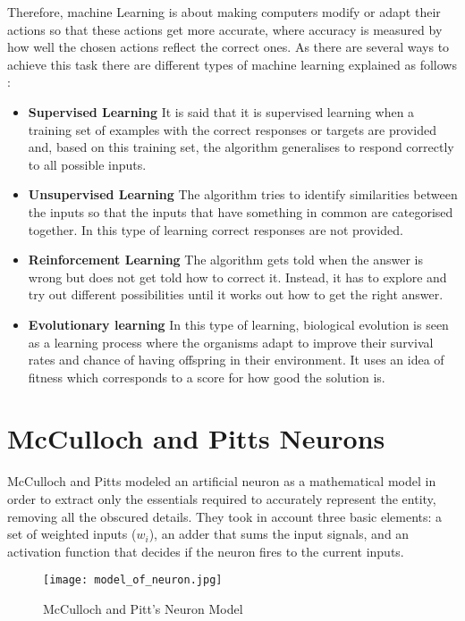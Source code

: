 Therefore, machine Learning is about making computers modify or adapt their actions so that these actions get more accurate, where accuracy is measured by how well the chosen actions reflect the correct ones. As there are several ways to achieve this task there are different types of machine learning explained as follows \cite{marsland2015machine}:

\begin{itemize}
\item \textbf{Supervised Learning} It is said that it is supervised learning when a training set of examples with the correct responses or targets are provided and, based on this training set, the algorithm generalises to respond correctly to all possible inputs.

\item \textbf{Unsupervised Learning} The algorithm tries to identify similarities between the inputs so that the inputs that have something in common are categorised together. In this type of learning correct responses are not provided.

\item \textbf{Reinforcement Learning} The algorithm gets told when the answer is wrong but does not get told how to correct it. Instead, it has to explore and try out different possibilities until it works out how to get the right answer. 

\item \textbf{Evolutionary learning} In this type of learning, biological evolution is seen as a learning process where the organisms adapt to improve their survival rates and chance of having offspring in their environment. It uses an idea of fitness which corresponds to a score for how good the solution is. 
\end{itemize}

\section{McCulloch and Pitts Neurons}
McCulloch and Pitts modeled an artificial neuron as a mathematical model in order to extract only the essentials required to accurately represent the entity, removing all the obscured details. They took in account three basic elements: a set of weighted inputs ($w_i$), an adder that sums the input signals, and an activation function that decides if the neuron fires to the current inputs.
\begin{figure}[h]
\centering
 
\texttt{[image: model\_of\_neuron.jpg]}
\caption{McCulloch and Pitt's Neuron Model}
\label{fig:neuron}
\end{figure}

